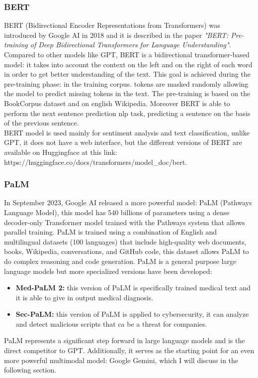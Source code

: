 \subsubsection{BERT}
BERT (Bidirectional Encoder Representations from Transformers) was introduced by Google AI in 2018 and it is described in the paper \textit{"BERT: Pre-training of Deep Bidirectional Transformers for Language Understanding"}.\cite{kenton2019bert} Compared to other models like GPT, BERT is a bidirectional transformer-based model: it takes into account the context on the left and on the right of each word in order to get better understanding of the text. This goal is achieved during the pre-training phase: in the training corpus. tokens are masked randomly allowing the model to predict missing tokens in the text. The pre-training is based on the BookCorpus dataset\cite{bandy2021addressing} and on english Wikipedia. Moreover BERT is able to perform the next sentence prediction nlp task\cite{shi2019next}, predicting a sentence on the basis of the previous sentence.\\
BERT model is used mainly for sentiment analysis and text classification, unlike GPT, it does not have a web interface, but the different versions of BERT are available on Huggingface at this link:\\ https://huggingface.co/docs/transformers/model\_doc/bert.
\subsubsection{PaLM}
In September 2023, Google AI released a more powerful model: PaLM (Pathways Language Model), this model has 540 billions of parameters using a dense decoder-only Transformer model trained with the Pathways system that allows parallel training. \cite{anil2023palm}\cite{barham2022pathways}
PaLM is trained  using a combination of English and multilingual datasets (100 languages) that include high-quality web documents, books, Wikipedia, conversations, and GitHub code, this dataset allows PaLM to do complex reasoning and code generation.\cite{palm2_intro} PaLM is a general purpose large language models but more specialized versions have been developed: 
\begin{itemize}
    \item \textbf{Med-PaLM 2:} this version of PaLM is specifically trained medical text and it is able to give in output medical diagnosis. 
    \item \textbf{Sec-PaLM:} this version of PaLM is applied to cybersecurity, it can analyze and detect malicious scripts that ca be a threat for companies.
\end{itemize}
PaLM represents a significant step forward in large language models and is the direct competitor to GPT. Additionally, it serves as the starting point for an even more powerful multimodal model: Google Gemini, which I will discuss in the following section.

